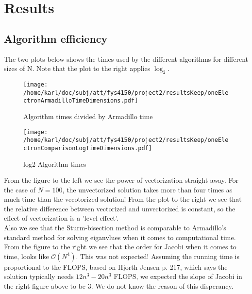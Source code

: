 \documentclass{article}
\begin{document}
\section{Results}

\subsection{Algorithm efficiency}
The two plots below shows the times used by the different algorithms for different sizes of N. Note that the plot to the right applies $\log_2$.

\begin{minipage}{.49\textwidth} %
	\begin{figure}[H]
		\centering
		\texttt{[image: /home/karl/doc/subj/att/fys4150/project2/resultsKeep/oneElectronArmadilloTimeDimensions.pdf]}
		\caption{Algorithm times divided by Armadillo time}
		\label{1}
	\end{figure}
\end{minipage}\hfill
\vspace{2ex}
\begin{minipage}{.49\textwidth}
	\begin{figure}[H]
		\centering
		\texttt{[image: /home/karl/doc/subj/att/fys4150/project2/resultsKeep/oneElectronComparisonLogTimeDimensions.pdf]}
		\caption{log2 Algorithm times}
		\label{1}
	\end{figure}
\end{minipage}\hfill
\vspace{2ex}

From the figure to the left we see the power of vectorization straight away. For the case of $N = 100$, the unvectorized solution takes more than four times as much time than the vecotorized solution! From the plot to the right we see that the relative difference between vectorized and unvectorized is constant, so the effect of vectorization is a 'level effect'. \\

Also we see that the Sturm-bisection method is comparable to Armadillo's standard method for solving eiganvlues when it comes to computational time.\\

From the figure to the right we see that the order for Jacobi when it comes to time, looks like $\mathcal{O}(N^4).$ This was not expected! Assuming the running time is proportional to the FLOPS, based on Hjorth-Jensen \cite{MHJ} p. 217, which says the solution typically needs $12n^3-20n^3$ FLOPS, we expected the slope of Jacobi in the right figure above to be 3. We do not know the reason of this disperancy.\\
\end{document}
